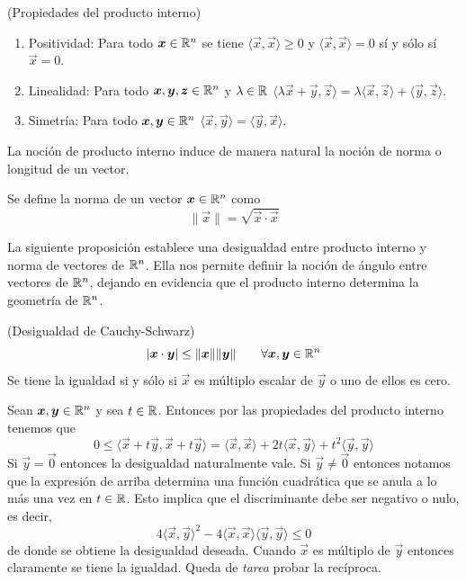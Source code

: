 \begin{proposicion}(Propiedades del  producto interno)
\begin{enumerate}
\item Positividad: Para todo $\boldsymbol{x}\in \mathbb{R}^n$ se tiene $\langle \vec{x},\vec{x}\rangle\ge 0$ y 
$\langle \vec{x},\vec{x}\rangle=0$ s\'i y s\'olo s\'i $\vec{x}=0$.
\item Linealidad: Para todo $ \boldsymbol{x},\boldsymbol{y},\boldsymbol{z} \in \mathbb{R}^n$ y 
$\lambda\in \mathbb{R}$  $\langle \lambda \vec{x}+\vec{y},\vec{z}\rangle = 
\lambda\langle \vec{x}, \vec{z}\rangle +\langle \vec{y},  \vec{z}\rangle$.
\item Simetr\'ia: Para todo $ \boldsymbol{x},\boldsymbol{y} \in \mathbb{R}^n$ $\langle \vec{x}, \vec{y}\rangle=\langle \vec{y}, \vec{x}\rangle$.
\end{enumerate}
\end{proposicion}
La noci\'on de producto interno induce de manera natural la noci\'on de norma
o longitud de un vector.
\begin{definicion}  
Se define la norma de un vector $\boldsymbol{x} \in \mathbb{R}^n$ como
$$\|\vec{x}\|= \sqrt{\vec{x}\cdot \vec{x}}$$
\end{definicion}
La siguiente proposici\'on establece una desigualdad entre producto interno y norma de vectores de $\mathbb{R}^n$. Ella nos permite definir la noci\'on de \'angulo entre
vectores de $\mathbb{R}^n$, dejando en evidencia que el producto interno determina la 
geometr\'ia de $\mathbb{R}^n$.
\begin{proposicion}{\rm (Desigualdad de Cauchy-Schwarz)}
$$|\boldsymbol{x}\cdot \boldsymbol{y}| \leq \|\boldsymbol{x}\|\|\boldsymbol{y}\| \qquad \forall \boldsymbol{x},\boldsymbol{y} \in \mathbb{R}^n$$
Se tiene la igualdad si y s\'olo si $\vec{x}$ es m\'ultiplo escalar de $\vec{y}$ o uno de ellos es cero.
\end{proposicion}
\begin{demostracion}
Sean $\boldsymbol{x},\boldsymbol{y} \in \mathbb{R}^n$ y sea $t\in \mathbb{R}$. Entonces por las propiedades del 
producto interno tenemos que
$$
0\le \langle \vec{x}+t\vec{y},\vec{x}+t\vec{y}\rangle= \langle \vec{x},\vec{x}\rangle +2t\langle \vec{x},\vec{y}\rangle+
t^2\langle \vec{y},\vec{y}\rangle
$$
Si $\vec{y}=\vec{0}$ entonces la desigualdad naturalmente vale. Si $\vec{y}\neq \vec{0}$ entonces notamos
que la expresi\'on de arriba determina una funci\'on cuadr\'atica que se anula
a lo m\'as una vez en $t\in \mathbb{R}$. 
Esto implica que el discriminante debe ser negativo o nulo, es decir,
$$
4\langle \vec{x},\vec{y}\rangle^2-4\langle \vec{x},\vec{x}\rangle\langle \vec{y},\vec{y}\rangle\le 0
$$
de donde se obtiene la desigualdad deseada. Cuando $\vec{x}$ es m\'ultiplo de  $\vec{y}$ entonces claramente se tiene la igualdad. Queda de \emph{tarea} probar la rec\'iproca.
\end{demostracion}


